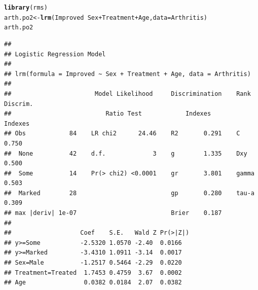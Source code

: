 \documentclass[11pt]{book}\usepackage[]{graphicx}\usepackage[]{color}
\makeatletter
\newcommand{\hlopt}[1]{\textcolor[rgb]{0,0,0}{#1}}%
\newcommand{\hlstd}[1]{\textcolor[rgb]{0.345,0.345,0.345}{#1}}%
\newcommand{\hlkwb}[1]{\textcolor[rgb]{0.69,0.353,0.396}{#1}}%
\newcommand{\hlkwc}[1]{\textcolor[rgb]{0.333,0.667,0.333}{#1}}%
\newcommand{\hlkwd}[1]{\textcolor[rgb]{0.737,0.353,0.396}{\textbf{#1}}}%
\newenvironment{kframe}{%
 \def\at@end@of@kframe{}%
 \ifinner\ifhmode%
  \def\at@end@of@kframe{\end{minipage}}%
  \begin{minipage}{\columnwidth}%
 \fi\fi%
 \def\FrameCommand##1{\hskip\@totalleftmargin \hskip-\fboxsep
 \colorbox{shadecolor}{##1}\hskip-\fboxsep
     \hskip-\linewidth \hskip-\@totalleftmargin \hskip\columnwidth}%
 \MakeFramed {\advance\hsize-\width
   \@totalleftmargin\z@ \linewidth\hsize
   \@setminipage}}%
 {\par\unskip\endMakeFramed%
 \at@end@of@kframe}
\newenvironment{knitrout}{}{} %
\renewenvironment{knitrout}{\small\renewcommand{\baselinestretch}{.85}}{} %
\makeatother
\begin{document}
\begin{knitrout}
\color{fgcolor}\begin{kframe}
\begin{alltt}
\hlkwd{library}\hlstd{(rms)}
\hlstd{arth.po2} \hlkwb{<-} \hlkwd{lrm}\hlstd{(Improved} \hlopt{~} \hlstd{Sex} \hlopt{+} \hlstd{Treatment} \hlopt{+} \hlstd{Age,} \hlkwc{data}\hlstd{=Arthritis)}
\hlstd{arth.po2}
\end{alltt}
\begin{verbatim}
## 
## Logistic Regression Model
## 
## lrm(formula = Improved ~ Sex + Treatment + Age, data = Arthritis)
## 
##                       Model Likelihood     Discrimination    Rank Discrim.    
##                          Ratio Test            Indexes          Indexes       
## Obs            84    LR chi2      24.46    R2       0.291    C       0.750    
##  None          42    d.f.             3    g        1.335    Dxy     0.500    
##  Some          14    Pr(> chi2) <0.0001    gr       3.801    gamma   0.503    
##  Marked        28                          gp       0.280    tau-a   0.309    
## max |deriv| 1e-07                          Brier    0.187                     
## 
##                   Coef    S.E.   Wald Z Pr(>|Z|)
## y>=Some           -2.5320 1.0570 -2.40  0.0166  
## y>=Marked         -3.4310 1.0911 -3.14  0.0017  
## Sex=Male          -1.2517 0.5464 -2.29  0.0220  
## Treatment=Treated  1.7453 0.4759  3.67  0.0002  
## Age                0.0382 0.0184  2.07  0.0382
\end{verbatim}
\end{kframe}
\end{knitrout}
\end{document}
